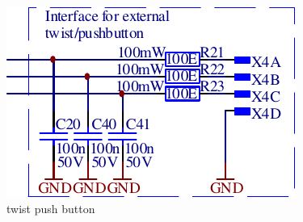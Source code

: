 \begin{figure}[th!]
    \center
    \includegraphics[width=.4\textwidth]{images/circuit/pushbutton.pdf}
    \caption{twist push button}
    \label{fig:circuit:pushbutton}
\end{figure}
